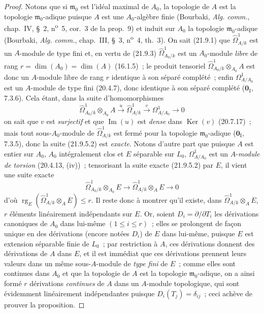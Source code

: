 \begin{proof}
Notons que si $\mathfrak m_0$ est l'idéal maximal de $A_0$, la topologie de
$A$ est la topologie $\mathfrak m_0$-adique puisque $A$ est une
$A_0$-algèbre finie (Bourbaki, \emph{Alg. comm.}, chap.~IV, \S~2,
n\textsuperscript{o}~5, cor.~3 de la prop.~9) et induit sur $A_0$ la topologie
$\mathfrak m_0$-adique (Bourbaki, \emph{Alg. comm.}, chap.~III, \S~3,
n\textsuperscript{o}~4, th.~3). On sait (21.9.1) que
$\widehat\Omega^1_{A/k}$ est un $A$-module de type fini et,
en vertu de (21.9.3) $\widehat\Omega^1_{A_0/k}$ est un $A_0$-module \emph{libre} de
rang $r=\dim(A_0)=\dim(A)$ (16.1.5)~; le produit tensoriel
$\widehat\Omega^1_{A_0/k}\otimes_{A_0}A$ est donc un $A$-module libre de rang
$r$ identique à son séparé complété~; enfin $\Omega^1_{A/A_0}$ est
un $A$-module de type fini (20.4.7), donc identique à son séparé complété
($\mathbf 0_{\mathrm I}$, 7.3.6). Cela étant, dans la suite d'homomorphismes
\begin{equation}
\tag{21.9.5.2}
\label{0.21.9.5.2-fr}
  \widehat\Omega^1_{A_0/k}\otimes_{A_0}A
  \xrightarrow{u}\widehat\Omega^1_{A/k}
  \xrightarrow{v}\Omega^1_{A/A_0}\longrightarrow0
\end{equation}
on sait que $v$ est \emph{surjectif} et que $\operatorname{Im}(u)$ est \emph{dense} dans
$\operatorname{Ker}(v)$ (20.7.17)~; mais tout sous-$A_0$-module de
$\widehat\Omega^1_{A/k}$ est fermé pour la topologie $\mathfrak m_0$-adique
($\mathbf 0_{\mathrm I}$, 7.3.5), donc la suite (21.9.5.2) est \emph{exacte}. Notons
d'autre part que puisque $A$ est entier sur $A_0$, $A_0$ intégralement clos
et $E$ séparable sur $L_0$, $\Omega^1_{A/A_0}$ est un $A$-\emph{module de
torsion} (20.4.13, (iv))~; tensorisant la suite exacte (21.9.5.2) par $E$, il
vient une suite exacte
\[
  \widehat\Omega^1_{A_0/k}\otimes_{A_0}E
  \longrightarrow \widehat\Omega^1_{A/k}\otimes_AE\longrightarrow0
\]
d'où $\operatorname{rg}_E(\widehat\Omega^1_{A/k}\otimes_AE)\leqslant r$. Il
reste donc à montrer qu'il existe, dans $\widehat\Omega^1_{A/k}\otimes_AE$,
$r$ éléments linéairement indépendants sur $E$. Or, soient
$D_i=\partial/\partial T_i$ les dérivations canoniques de $A_0$ dans lui-même
$(1\leqslant i\leqslant r)$~; elles se prolongent de façon unique en des
dérivations (encore notées $D_i$) de $E$ dans lui-même, puisque $E$ est
extension séparable finie de $L_0$~; par restriction à $A$, ces dérivations
donnent des dérivations de $A$ dans $E$, et il est immédiat que ces
dérivations prennent leurs valeurs dans un même sous-$A$-module de \emph{type fini}
de $E$~; comme elles sont continues dans $A_0$ et que la topologie de $A$ est
la topologie $\mathfrak m_0$-adique, on a ainsi formé $r$ dérivations
\emph{continues} de $A$ dans un $A$-module topologique, qui sont évidemment
linéairement indépendantes puisque $D_i(T_j)=\delta_{ij}$~; ceci achève de
prouver la proposition.
\end{proof}

